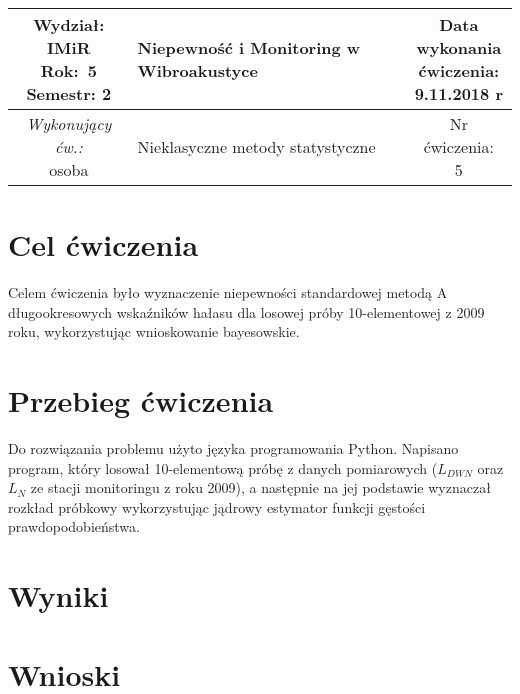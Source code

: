 \documentclass[polish,a4paper,11pt]{mwart}
\let\Oldsection\section
\renewcommand{\section}{\FloatBarrier\Oldsection}
\begin{document}
	\begin{table}[h] %
	\centering
		\begin{tabular}{ | c |  >{\centering\arraybackslash}m{5.5cm} | c | }
			\hline
			\makecell{ \textbf{Wydział:} \\ IMiR \\ \textbf{Rok:}~5 \\ Semestr: 2 } &
			\textbf{\large{Niepewność i Monitoring w Wibroakustyce}} &
			\makecell{Data \\ wykonania \\ ćwiczenia: \\ 9.11.2018 r} \\ \hline
			\makecell{\emph{Wykonujący ćw.:} \\ osoba } &
			\large{Nieklasyczne metody statystyczne} &
			\makecell{Nr ćwiczenia: \\ 5} \\ \hline
		\end{tabular}
	\end{table}

  \section{Cel ćwiczenia}
    Celem ćwiczenia było wyznaczenie niepewności standardowej metodą A
    długookresowych wskaźników hałasu dla losowej próby 10-elementowej z 2009
    roku, wykorzystując wnioskowanie bayesowskie.

  \section{Przebieg ćwiczenia}
    Do rozwiązania problemu użyto języka programowania Python. Napisano
    program, który losował 10-elementową próbę z danych pomiarowych ($L_{DWN}$
    oraz $L_N$ ze stacji monitoringu z roku 2009), a następnie na jej podstawie
    wyznaczał rozkład próbkowy wykorzystując jądrowy estymator funkcji gęstości
    prawdopodobieństwa. 


  \section{Wyniki}

  \section{Wnioski}
\end{document}
